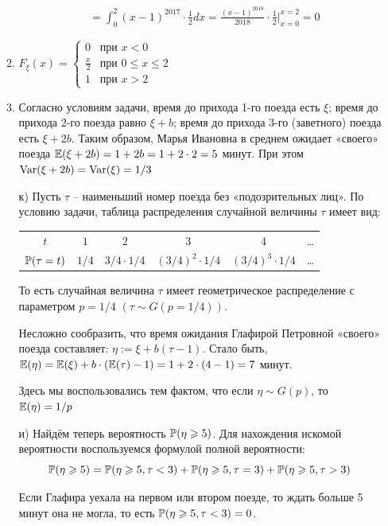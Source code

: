 \begin{enumerate}
\begin{enumerate}
\begin{align*}
&= \int_{0}^{2} (x-1)^{2017} \cdot \frac{1}{2} dx = \frac{(x-1)^{2018}}{2018} \cdot \frac{1}{2} \bigg\rvert_{x=0}^{x=2} =0
\end{align*}
\item $F_{\xi} (x) =
\begin{cases}
0 & \text{при } x < 0 \\
\frac{x}{2} & \text{при } 0 \leq x \leq 2 \\
1 & \text{при } x > 2
\end{cases}
$
\item Согласно условиям задачи, время до прихода 1-го поезда есть $\xi$; время до прихода 2-го поезда равно $\xi + b$; время до прихода 3-го (заветного) поезда есть $\xi + 2b$. Таким образом, Марья Ивановна в среднем ожидает «своего» поезда $\E (\xi + 2b) = 1 + 2b = 1 + 2 \cdot 2 = 5 $ минут. При этом $\Var (\xi + 2b) = \Var (\xi) = 1/3$
\item[к)] Пусть $\tau$ – наименьший номер поезда без «подозрительных лиц». По условию задачи, таблица распределения случайной величины $\tau$ имеет вид:

\begin{center}
\begin{tabular}{cccccc}
\toprule
$t$ & $ 1 $ & $2$ & $3$ & $4$ & \ldots \\
$\P(\tau = t)$ & $1/4$ & $3/4\cdot1/4$ & $(3/4)^2 \cdot 1/4$ & $(3/4)^3 \cdot 1/4$ & \ldots\\ \bottomrule
\end{tabular}
\end{center}

То есть случайная величина $\tau$ имеет геометрическое распределение с параметром $p=1/4$ $(\tau \sim G(p=1/4))$.

Несложно сообразить, что время ожидания Глафирой Петровной «своего» поезда составляет: $\eta := \xi + b(\tau- 1)$. Стало быть, $\E (\eta) = \E (\xi) + b \cdot (\E(\tau)-1)  = 1 + 2 \cdot (4-1) = 7$ минут.

Здесь мы воспользовались тем фактом, что если $\eta \sim G(p)$, то $\E (\eta) = 1/p$
\item[и)] Найдём теперь вероятность $\P (\eta \geq 5 )$. Для нахождения искомой вероятности воспользуемся формулой полной вероятности:
\[
\P (\eta \geq 5) = \P(\eta \geq 5, \tau < 3) + \P(\eta \geq 5, \tau = 3) +
\P(\eta \geq 5, \tau > 3)
\]

Если Глафира уехала на первом или втором поезде,
то ждать больше 5 минут она не могла, то есть $\P(\eta \geq 5, \tau <3)=0$.


\end{enumerate}
\end{enumerate}
